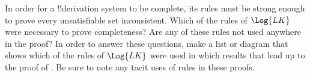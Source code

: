 \documentclass[../../../include/open-logic-section]{subfiles}
\begin{document}
\begin{prob}
In order for a !!{derivation} system to be complete, its rules must be
strong enough to prove every unsatisfiable set inconsistent.  Which of
the rules of $\Log{LK}$ were necessary to prove completeness?  Are any
of these rules not used anywhere in the proof?  In order to answer
these questions, make a list or diagram that shows which of the rules
of $\Log{LK}$ were used in which results that lead up to the proof of
.  Be sure to note any tacit
uses of rules in these proofs.
\end{prob}
\end{document}
